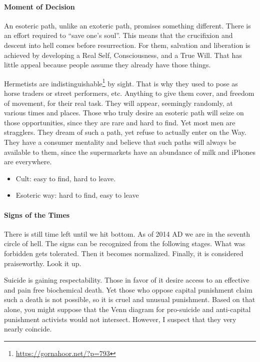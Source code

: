 \paragraph{Moment of Decision}


An esoteric path, unlike an exoteric path, promises something different. There is an effort required to ``save one's soul''. This means that the crucifixion and descent into hell comes before resurrection. For them, salvation and liberation is achieved by developing a Real Self, Consciousness, and a True Will. That has little appeal because people assume they already have those things.

Hermetists are indistinguishable\footnote{\url{https://gornahoor.net/?p=793}} by sight. That is why they used to pose as horse traders or street performers, etc. Anything to give them cover, and freedom of movement, for their real task. They will appear, seemingly randomly, at various times and places. Those who truly desire an esoteric path will seize on those opportunities, since they are rare and hard to find. Yet most men are stragglers. They dream of such a path, yet refuse to actually enter on the Way. They have a consumer mentality and believe that such paths will always be available to them, since the supermarkets have an abundance of milk and iPhones are everywhere.

\begin{itemize}


\item Cult: easy to find, hard to leave.

\item Esoteric way: hard to find, easy to leave
\end{itemize}


\paragraph{Signs of the Times}


There is still time left until we hit bottom. As of 2014 AD we are in the seventh circle of hell. The signs can be recognized from the following stages. What was forbidden gets tolerated. Then it becomes normalized. Finally, it is considered praiseworthy. Look it up.

Suicide is gaining respectability. Those in favor of it desire access to an effective and pain free biochemical death. Yet those who oppose capital punishment claim such a death is not possible, so it is cruel and unusual punishment. Based on that alone, you might suppose that the Venn diagram for pro-suicide and anti-capital punishment activists would not intersect. However, I suspect that they very nearly coincide.


